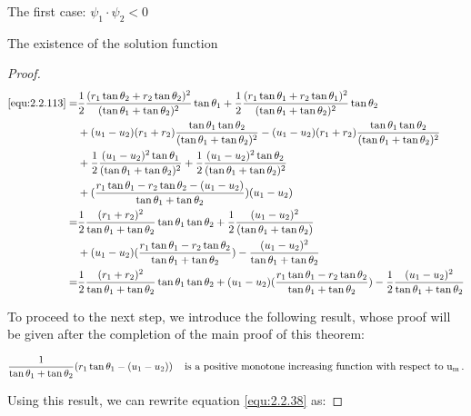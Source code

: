 \documentclass[letterpaper,reqno,10pt,twoside]{amsart}
\theoremstyle{definition}
\theoremstyle{remark}
\begin{document}
\begin{section}{The first case: $\psi_1\cdot \psi_2<0$ }
\begin{subsection}{The existence of the solution function}
\begin{proof}
    \begin{align}
         \eqref{equ:2.2.113}=&\frac{1}{2}\frac{(r_1\tan\theta_2+r_2\tan\theta_2)^{2}}{(\tan\theta_1+\tan\theta_2)^{2}}\tan\theta_1+\frac{1}{2}\frac{(r_1\tan\theta_1+r_2\tan\theta_1)^{2}}{(\tan\theta_1+\tan\theta_2)^{2}}\tan\theta_2\notag\\
        &+(u_1-u_2)(r_1+r_2)\frac{\tan\theta_1\tan\theta_2}{(\tan\theta_1+\tan\theta_2)^{2}}-(u_1-u_2)(r_1+r_2)\frac{\tan\theta_1\tan\theta_2}{(\tan\theta_1+\tan\theta_2)^{2}}\notag\\
       & +\frac{1}{2}\frac{(u_1-u_2)^{2}\tan\theta_1}{(\tan\theta_1+\tan\theta_2)^{2}}+\frac{1}{2}\frac{(u_1-u_2)^{2}\tan\theta_2}{(\tan\theta_1+\tan\theta_2)^{2}}\notag\\
       & +(\frac{r_1\tan\theta_1-r_2\tan\theta_2-(u_1-u_2)}{\tan\theta_1+\tan\theta_{2}})(u_1-u_2) \notag \\
       =&\frac{1}{2}\frac{(r_1+r_2)^{2}}{\tan\theta_1+\tan\theta_2}\tan\theta_1\tan\theta_2+\frac{1}{2}\frac{(u_1-u_2)^{2}}{(\tan\theta_1+\tan\theta_2)}\notag\\
       & +(u_1-u_2)(\frac{r_1\tan\theta_1-r_2\tan\theta_2}{\tan\theta_1+\tan\theta_2})-\frac{(u_1-u_2)^{2}}{\tan\theta_1+\tan\theta_2}\notag\\
        =&\frac{1}{2}\frac{(r_1+r_2)^{2}}{\tan\theta_1+\tan\theta_2}\tan\theta_1\tan\theta_2+(u_1-u_2)(\frac{r_1\tan\theta_1-r_2\tan\theta_2}{\tan\theta_1+\tan\theta_2})-\frac{1}{2}\frac{(u_1-u_2)^{2}}{\tan\theta_1+\tan\theta_2} \label{equ:2.2.38}
    \end{align}

   To proceed to the next step, we introduce the following result, whose proof will be given after the completion of the main proof of this theorem:
    
    \begin{equation}{\label{equ:2.2.39}}
      \frac{1}{\tan\theta_1+\tan\theta_2} (r_1\tan\theta_1-(u_1-u_2)) ~~~\operatorname{is~ a~ positive~ monotone ~increasing ~function ~with~respect~to~ u_{m}}.
    \end{equation}

    \noindent Using this result, we can rewrite equation \eqref{equ:2.2.38} as:


\end{proof}
\end{subsection}
\end{section}
\end{document}
